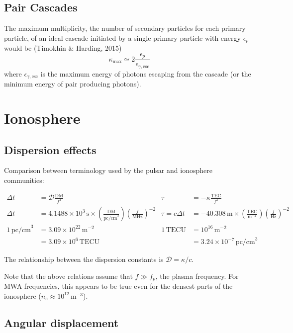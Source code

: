 \documentclass{book}
\begin{document}
\section{Pair Cascades}

The maximum multiplicity, the number of secondary particles for each primary particle, of an ideal cascade initiated by a single primary particle with energy $\epsilon_p$ would be (Timokhin \& Harding, 2015)
\begin{equation}
    \kappa_\text{max} \simeq 2\frac{\epsilon_p}{\epsilon_{\gamma,\text{esc}}}
\end{equation}
where $\epsilon_{\gamma,\text{esc}}$ is the maximum energy of photons escaping from the cascade (or the minimum energy of pair producing photons).

\chapter{Ionosphere}

\section{Dispersion effects}

Comparison between terminology used by the pulsar and ionosphere communities:

\begin{align}
    \Delta t &= \mathcal{D} \frac{\text{DM}}{f^2} &
        \tau &= -\kappa \frac{\text{TEC}}{f^2} \\
    \Delta t &= 4.1488\times10^3\,\text{s} \times \left(\frac{\text{DM}}{\text{pc/cm}^3}\right) \left(\frac{f}{\text{MHz}}\right)^{-2} &
        \tau = c\Delta t &= -40.308\,\text{m} \times \left(\frac{\text{TEC}}{\text{m}^{-2}}\right) \left(\frac{f}{\text{Hz}}\right)^{-2} \\
    1\,\text{pc/cm}^3 &= 3.09\times10^{22}\,\text{m}^{-2} &
        1\,\text{TECU} &= 10^{16}\,\text{m}^{-2} \\
    &= 3.09\times10^6\,\text{TECU} &
        &= 3.24\times10^{-7}\,\text{pc/cm}^3
\end{align}

The relationship between the dispersion constants is $\mathcal{D} = \kappa/c$.

Note that the above relations assume that $f \gg f_p$, the plasma frequency.
For MWA frequencies, this appears to be true even for the densest parts of the ionosphere ($n_e \approx 10^{12}\,\text{m}^{-3}$).

\section{Angular displacement}
\end{document}
